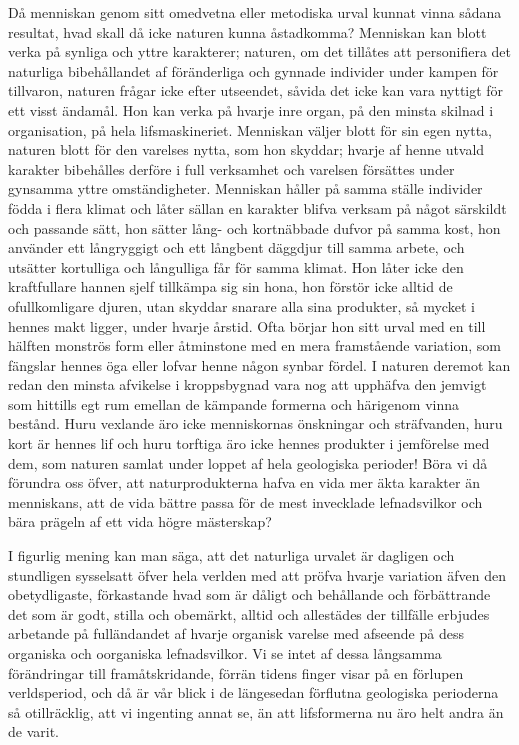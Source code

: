 Då menniskan genom sitt omedvetna eller metodiska urval kunnat vinna sådana resultat, hvad skall då icke naturen kunna åstadkomma? Menniskan kan blott verka på synliga och yttre karakterer; naturen, om det tillåtes att personifiera det naturliga bibehållandet af föränderliga och gynnade individer under kampen för tillvaron, naturen frågar icke efter utseendet, såvida det icke kan vara nyttigt för ett visst ändamål. Hon kan verka på hvarje inre organ, på den minsta skilnad i organisation, på hela lifsmaskineriet. Menniskan väljer blott för sin egen nytta, naturen blott för den varelses nytta, som hon skyddar; hvarje af henne utvald karakter bibehålles derföre i full verksamhet och varelsen försättes under gynsamma yttre omständigheter. Menniskan håller på samma ställe individer födda i flera klimat och låter sällan en karakter blifva verksam på något särskildt och passande sätt, hon sätter lång- och kortnäbbade dufvor på samma kost, hon använder ett långryggigt och ett långbent däggdjur till samma arbete, och utsätter kortulliga och långulliga får för samma klimat. Hon låter icke den kraftfullare hannen sjelf tillkämpa sig sin hona, hon förstör icke alltid de ofullkomligare djuren, utan skyddar snarare alla sina produkter, så mycket i hennes makt ligger, under hvarje årstid. Ofta börjar hon sitt urval med en till hälften monströs form eller åtminstone med en mera framstående variation, som fängslar hennes öga eller lofvar henne någon synbar fördel. I naturen deremot kan redan den minsta afvikelse i kroppsbygnad vara nog att upphäfva den jemvigt som hittills egt rum emellan de kämpande formerna och härigenom vinna bestånd. Huru vexlande äro icke menniskornas önskningar och sträfvanden, huru kort är hennes lif och huru torftiga äro icke hennes produkter i jemförelse med dem, som naturen samlat under loppet af hela geologiska perioder! Böra vi då förundra oss öfver, att naturprodukterna hafva en vida mer äkta karakter än menniskans, att de vida bättre passa för de mest invecklade lefnadsvilkor och bära prägeln af ett vida högre mästerskap?

I figurlig mening kan man säga, att det naturliga urvalet är dagligen och stundligen sysselsatt öfver hela verlden med att pröfva hvarje variation äfven den obetydligaste, förkastande hvad som är dåligt och behållande och förbättrande det som är godt, stilla och obemärkt, alltid och allestädes der tillfälle erbjudes arbetande på fulländandet af hvarje organisk varelse med afseende på dess organiska och oorganiska lefnadsvilkor. Vi se intet af dessa långsamma förändringar till framåtskridande, förrän tidens finger visar på en förlupen verldsperiod, och då är vår blick i de längesedan förflutna geologiska perioderna så otillräcklig, att vi ingenting annat se, än att lifsformerna nu äro helt andra än de varit.

